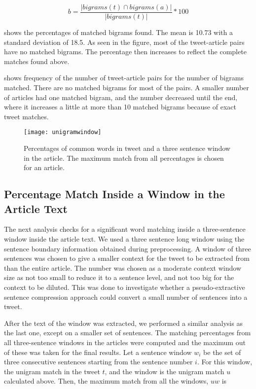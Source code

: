 \begin{equation}
b = \frac{| bigrams(t) \cap bigrams(a) |}{| bigrams(t) |} * 100
\end{equation}

 shows the percentages of matched bigrams found. The mean is 10.73 with a standard deviation of 18.5. As seen in the figure, most of the tweet-article pairs have no matched bigrams. The percentage then increases to reflect the complete matches found above.

 shows frequency of the number of tweet-article pairs for the number of bigrams matched. There are no matched bigrams for most of the pairs. A smaller number of articles had one matched bigram, and the number decreased until the end, where it increases a little at more than 10 matched bigrams because of exact tweet matches. 



\begin{figure}[tbp]
\centering
\texttt{[image: unigramwindow]}
\caption{Percentages of common words in tweet and a three sentence window in the article. The maximum match from all percentages is chosen for an article.}
\label{fig:unigramwindow}
\end{figure}


\subsection{Percentage Match Inside a Window in the Article Text}
\label{sec:window}

The next analysis checks for a significant word matching inside a three-sentence window inside the article text. We used a three sentence long window using the sentence boundary information obtained during preprocessing. A window of three sentences was chosen to give a smaller context for the tweet to be extracted from than the entire article. The number was chosen as a moderate context window size as not too small to reduce it to a sentence level, and not too big for the context to be diluted. This was done to investigate whether a pseudo-extractive sentence compression approach could convert a small number of sentences into a tweet.

After the text of the window was extracted, we performed a similar analysis as the last one, except on a smaller set of sentences. The matching percentages from all three-sentence windows in the articles were computed and the maximum out of these was taken for the final results. Let a sentence window $w_i$ be the set of three consecutive sentences starting from the sentence number $i$. For this window, the unigram match in the tweet $t$, and the window is the unigram match $u$ calculated above. Then, the maximum match from all the windows, $uw$ is 

